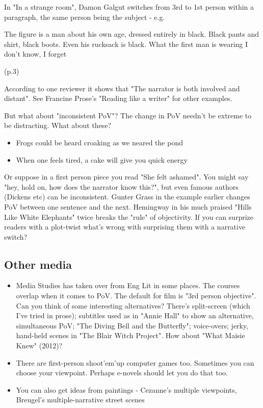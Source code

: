 \documentclass[11pt]{article}
\newenvironment{narrow}[2]{%
 \begin{list}{}{%
  \setlength{\topsep}{0pt}%
  \setlength{\leftmargin}{#1}%
  \setlength{\rightmargin}{#2}%
  \setlength{\listparindent}{\parindent}%
  \setlength{\itemindent}{\parindent}%
  \setlength{\parsep}{\parskip}%
 }%
\item[]}{\end{list}}
\begin{document}
In "In a strange room", Damon Galgut switches from 3rd to 1st person within a paragraph, the same person being the subject - e.g.

 \begin{narrow}{1.0cm}{1.0cm}
The figure is a man about his own age, dressed entirely in black. Black pants 
and shirt, black boots. Even his rucksack is black. What the first man is 
wearing I don't know, I forget
\end{narrow}
(p.3)


According to one reviewer it shows that "The narrator is both involved and distant". See Francine Prose's "Reading like a writer" for other examples.



But what about "inconsistent PoV"? The change in PoV needn't be extreme to be distracting. What about these?


\begin{itemize}
\item Frogs could be heard croaking as we neared the pond
\item When one feels tired, a cake will give you quick energy
\end{itemize}
Or suppose in a first person piece you read "She felt ashamed". You might say "hey, hold on, how does the narrator know this?", but even famous authors (Dickens etc) can be inconsistent. Gunter Grass in the example earlier changes PoV between one sentence and the next. Hemingway in his much praised "Hills Like White Elephants" twice breaks the "rule" of objectivity. If you can surprize readers with a plot-twist what's wrong with surprising them with a narrative switch?





\subsection*{Other media}
\begin{itemize}
\item Media Studies has taken over from Eng Lit in some places. The courses overlap when it comes to PoV. The default for film is "3rd person objective". Can you think of some interesting alternatives? There's split-screen (which I've tried in prose); subtitles used as in "Annie Hall" to show an alternative, simultaneous PoV; "The Diving Bell and the Butterfly"; voice-overs; jerky, hand-held scenes in "The Blair Witch Project". How about "What Maisie Knew" (2012)?
\item There are first-person shoot'em'up computer games too. Sometimes you can choose your viewpoint. Perhaps e-novels should let you do that too.
\item You can also get ideas from paintings - Cezanne's multiple viewpoints, Breugel's multiple-narrative street scenes
\end{itemize}
\end{document}
